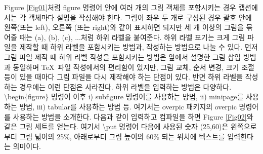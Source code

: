 \documentclass[twoside,11pt]{gshs_thesis}
\begin{document}
Figure \ref{Fig01}처럼 figure 명령어 안에 여러 개의 그림 객체를 포함시키는 경우 캡션에서는 각 객체마다 설명을 작성해야 한다. 그림이 좌우 두 개로 구성된 경우 괄호 안에 왼쪽(또는 left), 오른쪽 (또는 right)와 같이 표시하면 되지만 세 개 이상의 그림을 묶어줄 때는 (a), (b), (c), ...처럼 하위 라벨을 붙여준다. 하위 라벨 표기는 크게 그림 파일을 제작할 때 하위 라벨을 포함시키는 방법과,  작성하는 방법으로 나눌 수 있다. 먼저 그림 파일 제작 때 하위 라벨 작성을 포함시키는 방법은 앞에서 설명한 그림 삽입 방법과 동일하며 \TeX\ 파일 작성에서의 편리함이 있지만, 그림 교체, 순서 변경, 크기 조절 등이 있을 때마다 그림 파일을 다시 제작해야 하는 단점이 있다. 반면  하위 라벨을 작성하는 경우에는 이런 단점은 사라진다.  하위 라벨을 입력하는 방법은 다양하다. {\textbackslash}begin\{figure\} 명령어 이후 i) subfigure 명령어를 사용하는 방법, ii) minipage를 사용하는 방법, iii) tabular를 사용하는 방법 등. 여기서는 overpic 패키지의 overpic 명령어를 사용하는 방법을 소개한다. 다음과 같이 입력하고 컴파일을 하면 Figure \ref{Fig02}와 같은 그림 세트를 얻는다. 여기서 {\textbackslash}put 명령어 다음에 사용된 숫자 (25,60)은 왼쪽으로부터 그림 넓이의 25\%, 아래로부터 그림 높이의 60\% 되는 위치에 텍스트를 입력한다는 의미이다.

\begin{center}
\end{center}
\end{document}
